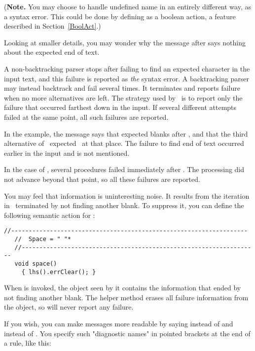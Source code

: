 (\textbf{Note.} 
You may choose to handle undefined name in an entirely different way,
as a syntax error.
This could be done by defining  as a boolean action,
a feature described in Section~\ref{BoolAct}.)

\medskip
Looking at smaller details,
you may wonder why the message after  says nothing about the expected end of text.

A non-backtracking parser stops after failing to find an expected character
in the input text, and this failure
is reported as \emph{the} syntax error.
A backtracking parser may instead backtrack
and fail several times.  
It terminates and reports failure when no more
alternatives are left.
The strategy used by \Mouse\ is to report only the failure that occurred 
farthest down in the input.
If several different attempts failed at the same point,
all such failures are reported.

In the example, the message says that  expected blanks after ,
and that the third alternative of \Factor\ expected \Sum\ at that place.
The failure to find end of text occurred earlier in the input and is not mentioned.

\medskip
In the case of , several procedures failed immediately after .
The processing did not advance beyond that point, so all these failures are reported.

You may feel that information  is uninteresting noise.
It results from the iteration in \Space\ terminated by not finding another blank.
To suppress it, you can define the following semantic action for :
%
\small
\begin{Verbatim}[frame=single,framesep=2mm,samepage=true,xleftmargin=15mm,xrightmargin=15mm,baselinestretch=0.8]
   //-------------------------------------------------------------------
   //  Space = " "*
   //-------------------------------------------------------------------
   void space()
     { lhs().errClear(); }
\end{Verbatim}
\normalsize
%
When  is invoked, the  object seen by it
contains the information that  ended
by not finding another blank.
The helper method  erases all failure information
from the  object, so  will never report any failure.

If you wish, you can make messages more readable by saying
 instead of  and  instead of .
You specify such "diagnostic names" in pointed brackets at the end of a rule, like this:

